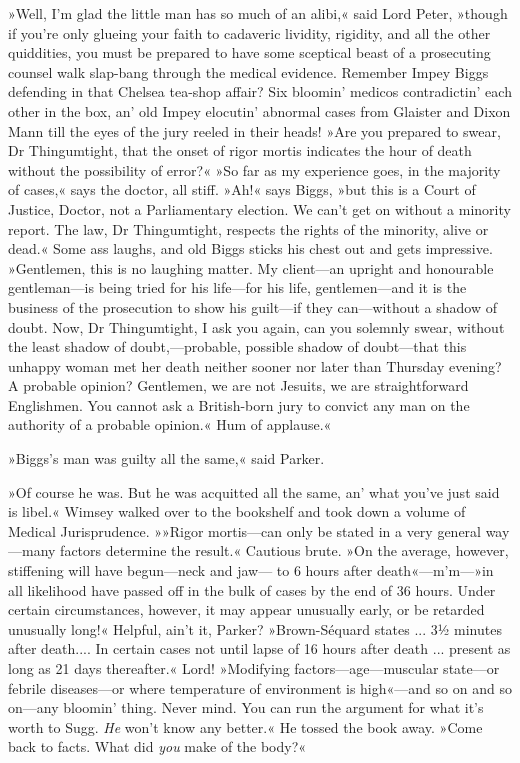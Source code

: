 »Well, I'm glad the little man has so much of an alibi,« said Lord Peter, »though if you're only glueing your faith to cadaveric lividity, rigidity, and all the other quiddities, you must be prepared to have some sceptical beast of a prosecuting counsel walk slap-bang through the medical evidence. Remember Impey Biggs defending in that Chelsea tea-shop affair? Six bloomin' medicos contradictin' each other in the box, an' old Impey elocutin' abnormal cases from Glaister and Dixon Mann till the eyes of the jury reeled in their heads! »Are you prepared to swear, Dr Thingumtight, that the onset of rigor mortis indicates the hour of death without the possibility of error?« »So far as my experience goes, in the majority of cases,« says the doctor, all stiff. »Ah!« says Biggs, »but this is a Court of Justice, Doctor, not a Parliamentary election. We can't get on without a minority report. The law, Dr Thingumtight, respects the rights of the minority, alive or dead.« Some ass laughs, and old Biggs sticks his chest out and gets impressive. »Gentlemen, this is no laughing matter. My client\allowbreak---\allowbreak an upright and honourable gentleman\allowbreak---\allowbreak is being tried for his life\allowbreak---\allowbreak for his life, gentlemen\allowbreak---\allowbreak and it is the business of the prosecution to show his guilt\allowbreak---\allowbreak if they can\allowbreak---\allowbreak without a shadow of doubt. Now, Dr Thingumtight, I ask you again, can you solemnly swear, without the least shadow of doubt,---probable, possible shadow of doubt\allowbreak---\allowbreak that this unhappy woman met her death neither sooner nor later than Thursday evening? A probable opinion? Gentlemen, we are not Jesuits, we are straightforward Englishmen. You cannot ask a British-born jury to convict any man on the authority of a probable opinion.« Hum of applause.«

»Biggs's man was guilty all the same,« said Parker.

»Of course he was. But he was acquitted all the same, an' what you've just said is libel.« Wimsey walked over to the bookshelf and took down a volume of Medical Jurisprudence. »»Rigor mortis\allowbreak---\allowbreak can only be stated in a very general way\allowbreak---\allowbreak many factors determine the result.« Cautious brute. »On the average, however, stiffening will have begun\allowbreak---\allowbreak neck and jaw\allowbreak--- to 6 hours after death«---m'm---»in all likelihood have passed off in the bulk of cases by the end of 36 hours. Under certain circumstances, however, it may appear unusually early, or be retarded unusually long!« Helpful, ain't it, Parker? »Brown-Séquard states ... 3½ minutes after death.... In certain cases not until lapse of 16 hours after death ... present as long as 21 days thereafter.« Lord! »Modifying factors\allowbreak---\allowbreak age---muscular state\allowbreak---\allowbreak or febrile diseases\allowbreak---\allowbreak or where temperature of environment is high«---and so on and so on\allowbreak---\allowbreak any bloomin' thing. Never mind. You can run the argument for what it's worth to Sugg. \textit{He} won't know any better.« He tossed the book away. »Come back to facts. What did \textit{you} make of the body?«

